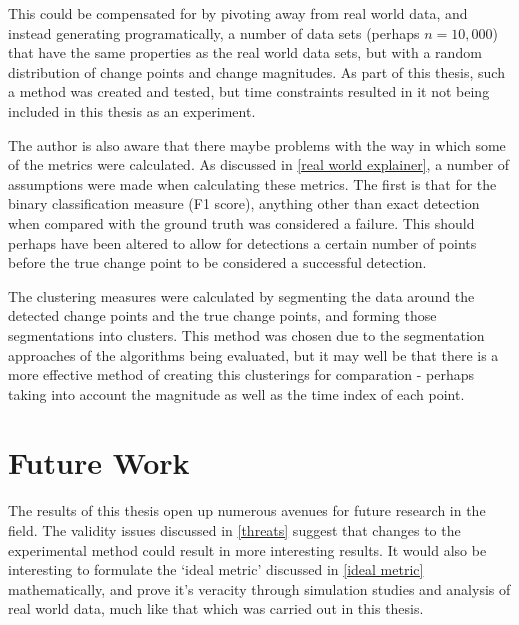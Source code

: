 \documentclass{uvamscse}	%
\begin{document}
This could be compensated for by pivoting away from real world data, and instead generating programatically, a number of data sets (perhaps $n = 10,000$) that have the same properties as the real world data sets, but with a random distribution of change points and change magnitudes. As part of this thesis, such a method was created and tested, but time constraints resulted in it not being included in this thesis as an experiment.

The author is also aware that there maybe problems with the way in which some of the metrics were calculated. As discussed in \autoref{real world explainer}, a number of assumptions were made when calculating these metrics. The first is that for the binary classification measure (F1 score), anything other than exact detection when compared with the ground truth was considered a failure. This should perhaps have been altered to allow for detections a certain number of points before the true change point to be considered a successful detection.

The clustering measures were calculated by segmenting the data around the detected change points and the true change points, and forming those segmentations into clusters. This method was chosen due to the segmentation approaches of the algorithms being evaluated, but it may well be that there is a more effective method of creating this clusterings for comparation - perhaps taking into account the magnitude as well as the time index of each point.


\chapter{Future Work}

The results of this thesis open up numerous avenues for future research in the field. The validity issues discussed in \autoref{threats} suggest that changes to the experimental method could result in more interesting results.
It would also be interesting to formulate the `ideal metric' discussed in \autoref{ideal metric} mathematically, and prove it's veracity through simulation studies and analysis of real world data, much like that which was carried out in this thesis.


\printbibliography
\end{document}
